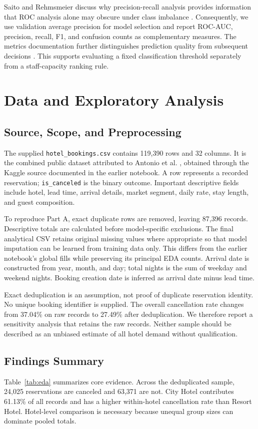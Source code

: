 \documentclass[conference]{IEEEtran}
\begin{document}
Saito and Rehmsmeier discuss why precision-recall analysis provides information that ROC analysis alone may obscure under class imbalance \cite{saito}. Consequently, we use validation average precision for model selection and report ROC-AUC, precision, recall, F1, and confusion counts as complementary measures. The metrics documentation further distinguishes prediction quality from subsequent decisions \cite{metrics}. This supports evaluating a fixed classification threshold separately from a staff-capacity ranking rule.

\section{Data and Exploratory Analysis}
\subsection{Source, Scope, and Preprocessing}
The supplied \texttt{hotel\_bookings.csv} contains 119,390 rows and 32 columns. It is the combined public dataset attributed to Antonio et al. \cite{dataset}, obtained through the Kaggle source documented in the earlier notebook. A row represents a recorded reservation; \texttt{is\_canceled} is the binary outcome. Important descriptive fields include hotel, lead time, arrival details, market segment, daily rate, stay length, and guest composition.

To reproduce Part A, exact duplicate rows are removed, leaving 87,396 records. Descriptive totals are calculated before model-specific exclusions. The final analytical CSV retains original missing values where appropriate so that model imputation can be learned from training data only. This differs from the earlier notebook's global fills while preserving its principal EDA counts. Arrival date is constructed from year, month, and day; total nights is the sum of weekday and weekend nights. Booking creation date is inferred as arrival date minus lead time.

Exact deduplication is an assumption, not proof of duplicate reservation identity. No unique booking identifier is supplied. The overall cancellation rate changes from 37.04\% on raw records to 27.49\% after deduplication. We therefore report a sensitivity analysis that retains the raw records. Neither sample should be described as an unbiased estimate of all hotel demand without qualification.

\subsection{Findings Summary}
Table~\ref{tab:eda} summarizes core evidence. Across the deduplicated sample, 24,025 reservations are canceled and 63,371 are not. City Hotel contributes 61.13\% of all records and has a higher within-hotel cancellation rate than Resort Hotel. Hotel-level comparison is necessary because unequal group sizes can dominate pooled totals.
\end{document}
